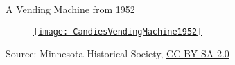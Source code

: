 %

\begin{frame}[fragile]{A Vending Machine from 1952}
\begin{figure}
    \centering
    \href{https://en.wikipedia.org/wiki/File:CandiesVendingMachine1952.jpg}{\texttt{[image: CandiesVendingMachine1952]}}

\end{figure}

{\tiny Source: Minnesota Historical Society, \href{https://creativecommons.org/licenses/by-sa/2.0}{CC BY-SA 2.0}}
\end{frame}

